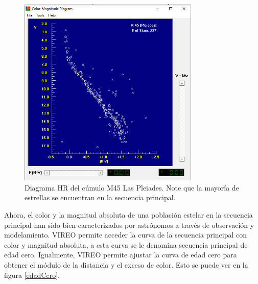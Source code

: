 \documentclass[12pt]{article}
\begin{document}
\begin{figure}[H]
  \centering
   \includegraphics[width= 3.40in]{hrvireo.png}
  \caption{Diagrama HR del cúmulo M45 Las Pleiades. Note que la mayoría de estrellas se encuentran en la secuencia principal.}
  \label{vireaohr}
\end{figure}

Ahora, el color y la magnitud absoluta de una población estelar en la secuencia principal han sido bien caracterizados por astrónomos a través de observación y modelamiento. VIREO permite acceder la curva de la secuencia principal con color y magnitud absoluta, a esta curva se le denomina secuencia principal de edad cero. Igualmente, VIREO permite ajustar la  curva de edad cero para obtener el módulo de la distancia y el exceso de color. Esto se puede ver en la figura \ref{edadCero}.
\end{document}
